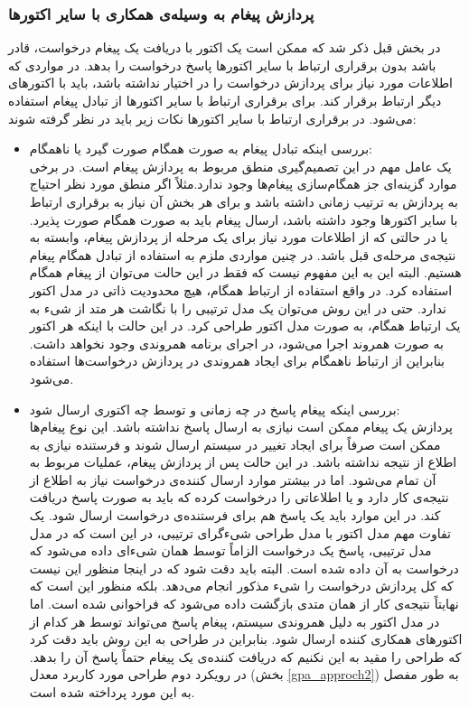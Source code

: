 \subsubsection{پردازش پیغام به وسیله‌ی همکاری با سایر اکتورها}
در بخش قبل ذکر شد که ممکن است یک اکتور با دریافت یک پیغام درخواست، قادر باشد بدون برقراری ارتباط با سایر اکتورها پاسخ درخواست را بدهد. در مواردی که اطلاعات مورد نیاز برای پردازش درخواست را در اختیار نداشته باشد، باید با اکتورهای دیگر ارتباط برقرار کند. برای برقراری ارتباط با سایر اکتورها از تبادل پیغام استفاده می‌شود. در برقراری ارتباط با سایر اکتورها نکات زیر باید در نظر گرفته شوند:\\
\begin{itemize}
\item بررسی اینکه تبادل پیغام به صورت همگام صورت گیرد یا ناهمگام:\\
یک عامل مهم در این تصمیم‌گیری منطق مربوط به پردازش پیغام است. در برخی موارد گزینه‌ای جز همگام‌سازی پیغام‌ها وجود ندارد.مثلاً اگر منطق مورد نظر احتیاج به پردازش به ترتیب زمانی داشته باشد و برای هر بخش آن نیاز به برقراری ارتباط با سایر اکتورها وجود داشته باشد، ارسال پیغام باید به صورت همگام صورت پذیرد. یا در حالتی که از اطلاعات مورد نیاز برای یک مرحله از پردازش پیغام، وابسته به نتیجه‌ی مرحله‌ی قبل باشد. در چنین مواردی ملزم به استفاده از تبادل همگام پیغام هستیم. البته این به این مفهوم نیست که فقط در این حالت می‌توان از پیغام همگام استفاده کرد. در واقع استفاده از ارتباط همگام، هیچ محدودیت ذاتی در مدل اکتور ندارد. حتی در این روش می‌توان یک مدل ترتیبی را با نگاشت هر متد از شیء به یک ارتباط همگام، به صورت مدل اکتور طراحی کرد. در این حالت با اینکه هر اکتور به صورت همروند اجرا می‌شود، در اجرای برنامه همروندی وجود نخواهد داشت.
بنابراین از ارتباط ناهمگام برای ایجاد همروندی در پردازش درخواست‌ها استفاده می‌شود.
\item بررسی اینکه پیغام پاسخ در چه زمانی و توسط چه اکتوری ارسال شود:\\
پردازش یک پیغام ممکن است نیازی به ارسال پاسخ نداشته باشد. این نوع پیغام‌ها ممکن است صرفاً برای ایجاد تغییر در سیستم ارسال شوند و فرستنده نیازی به اطلاع از نتیجه نداشته باشد. در این حالت پس از پردازش پیغام، عملیات مربوط به آن تمام می‌شود. اما در بیشتر موارد ارسال کننده‌ی درخواست نیاز به اطلاع از نتیجه‌ی کار دارد و یا اطلاعاتی را درخواست کرده که باید به صورت پاسخ دریافت کند. در این موارد باید یک پاسخ هم برای فرستنده‌ی درخواست ارسال شود. یک تفاوت مهم مدل اکتور با مدل طراحی شیءگرای ترتیبی،‌ در این است که در مدل مدل ترتیبی، پاسخ یک درخواست الزاماً توسط همان شیءای داده می‌شود که درخواست به آن داده شده است. البته باید دقت شود که در اینجا منظور این نیست که کل پردازش درخواست را شیء مذکور انجام می‌دهد. بلکه منظور این است که نهایتاً نتیجه‌ی کار از همان متدی بازگشت داده می‌شود که فراخوانی شده است. اما در مدل اکتور به دلیل همروندی سیستم،‌ پیغام پاسخ می‌تواند توسط هر کدام از اکتورهای همکاری کننده ارسال شود. بنابراین در طراحی به این روش باید دقت کرد که طراحی را مقید به این نکنیم که دریافت کننده‌ی یک پیغام حتماً پاسخ‌ آن را بدهد. در رویکرد دوم طراحی مورد کاربرد معدل (بخش \ref{gpa_approch2}) به طور مفصل به این مورد پرداخته شده است.

\end{itemize}
